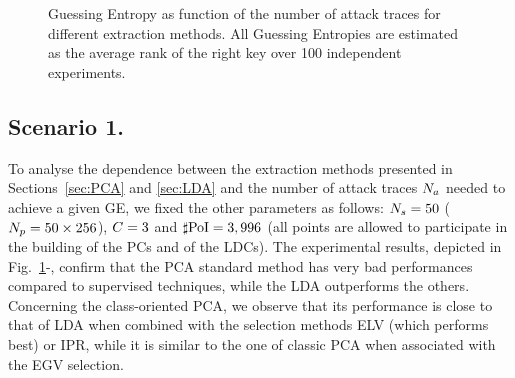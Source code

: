 \begin{figure}[t]
\caption[Guessing Entropy as function of the number of attack traces]{Guessing Entropy as function of the number of attack traces for different extraction methods. All Guessing Entropies are estimated as the average rank of the right key over 100 independent experiments.}\label{fig:scenario1}
\end{figure}
\subsection{Scenario 1.}
To analyse the dependence between the extraction methods presented in Sections~\ref{sec:PCA} and \ref{sec:LDA} and the number of attack traces $N_a$ needed to achieve a given GE, we fixed the other parameters as follows: $N_{s}=50$ ($N_p=50\times 256$), $C = 3$ and $\sharp\mathrm{PoI} = 3,996$ (all points are allowed to participate in the building of the PCs and of the LDCs). The experimental results, depicted in Fig.~\ref{fig:scenario1}-, confirm that the PCA standard method has very bad performances compared to supervised techniques, while the LDA outperforms the others. Concerning the class-oriented PCA, we observe that its performance is close to that of LDA when combined with the selection methods ELV (which performs best) or IPR, while it is similar to the one of classic PCA when associated with the EGV selection.



